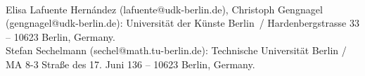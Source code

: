 \documentclass[twoside]{article}
\begin{document}
\nocite{*}

\ifreviewing\else\vfill

 \\[1ex]
Elisa Lafuente Hern\'andez (lafuente@udk-berlin.de), Christoph Gengnagel (gengnagel@udk-berlin.de): Universit\"at der K\"unste Berlin~/ 
Hardenbergstrasse 33 -- 10623 Berlin, Germany. \\
Stefan Sechelmann (sechel@math.tu-berlin.de): Technische Universit\"at Berlin / 
MA 8-3 Stra\ss e des 17. Juni 136 -- 10623  Berlin, Germany.\fi
\end{document}
